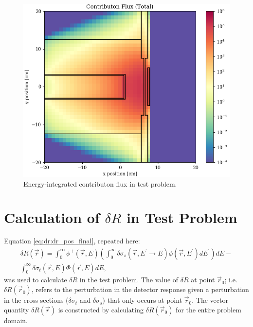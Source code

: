 \begin{figure}
  \centering
  \includegraphics[width=0.5\linewidth]{content/testprob/scalar_flux_con_total.png}
  \caption{Energy-integrated contributon flux in test problem.}
  \label{fig:tp:scalar_flux_con_total}
\end{figure}

\section{Calculation of $\delta R$ in Test Problem}
\label{sec:bg:tp:dr}

Equation \ref{eq:dr:dr_pos_final}, repeated here:
\begin{multline*}
  \delta R\left(\vec{r}\right) =
  \int_0^\infty\phi^+\left(\vec{r},E\right)\left(\int_0^\infty\delta\sigma_s\left(\vec{r},E^\prime\rightarrow E\right)\phi\left(\vec{r},E^\prime\right)dE^\prime\right)dE - \\
  \int_0^\infty\delta\sigma_t\left(\vec{r},E\right)\Phi\left(\vec{r},E\right)dE,
\end{multline*}
was used to calculate $\delta R$ in the test problem.
The value of $\delta R$ at point $\vec{r}_0$; i.e. $\delta R\left(\vec{r}_0\right)$, refers to the perturbation in the detector response given a perturbation in the cross sections ($\delta \sigma_t$ and $\delta \sigma_s$) that only occurs at point $\vec{r}_0$.
The vector quantity $\delta R\left(\vec{r}\right)$ is constructed by calculating $\delta R\left(\vec{r}_0\right)$ for the entire problem domain.

